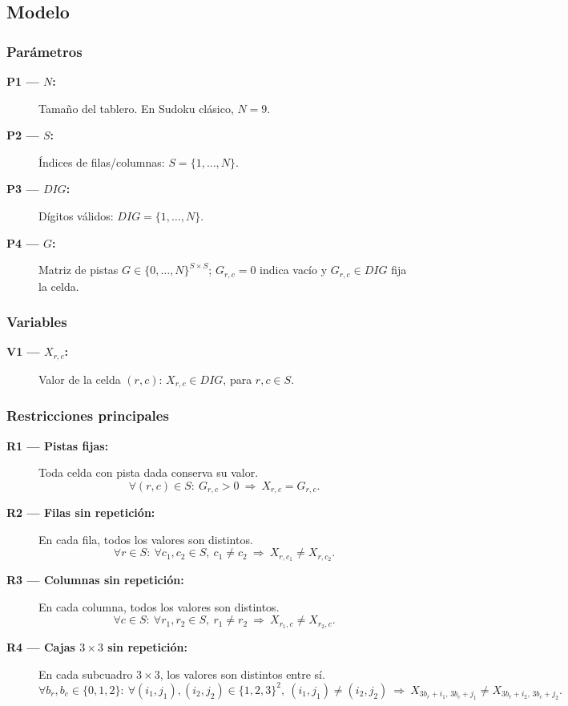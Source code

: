 
\subsection{Modelo}\label{sec:01-sudoku-modelo}

\subsubsection*{Parámetros}
\begin{description}
  \item[\textbf{P1 — \(N\):}] Tamaño del tablero. En Sudoku clásico, \(N=9\).
  \item[\textbf{P2 — \(S\):}] Índices de filas/columnas: \(S=\{1,\dots,N\}\).
  \item[\textbf{P3 — \(DIG\):}] Dígitos válidos: \(DIG=\{1,\dots,N\}\).
  \item[\textbf{P4 — \(G\):}] Matriz de pistas \(G\in\{0,\dots,N\}^{S\times S}\); \(G_{r,c}=0\) indica vacío y \(G_{r,c}\in DIG\) fija la celda.
\end{description}

\subsubsection*{Variables}
\begin{description}
  \item[\textbf{V1 — \(X_{r,c}\):}] Valor de la celda \((r,c)\): \(X_{r,c}\in DIG\), para \(r,c\in S\).
\end{description}

\subsubsection*{Restricciones principales}
\begin{description}
  \item[\textbf{R1 — Pistas fijas:}] Toda celda con pista dada conserva su valor.  
  \[
  \forall (r,c)\in S:\ G_{r,c} > 0 \ \Rightarrow\  X_{r,c} = G_{r,c}.
  \]

  \item[\textbf{R2 — Filas sin repetición:}] En cada fila, todos los valores son distintos.  
  \[
  \forall r \in S:\ \forall c_1, c_2 \in S,\ c_1 \neq c_2 \ \Rightarrow\  X_{r,c_1} \neq X_{r,c_2}.
  \]

  \item[\textbf{R3 — Columnas sin repetición:}] En cada columna, todos los valores son distintos.  
  \[
  \forall c \in S:\ \forall r_1, r_2 \in S,\ r_1 \neq r_2 \ \Rightarrow\  X_{r_1,c} \neq X_{r_2,c}.
  \]

  \item[\textbf{R4 — Cajas \(3\times3\) sin repetición:}] En cada subcuadro \(3\times3\), los valores son distintos entre sí.  
  \[
  \forall b_r,b_c \in \{0,1,2\}:\ 
  \forall (i_1,j_1),(i_2,j_2) \in \{1,2,3\}^2,\ (i_1,j_1) \neq (i_2,j_2) \ \Rightarrow\ 
  X_{3b_r+i_1,\,3b_c+j_1} \neq X_{3b_r+i_2,\,3b_c+j_2}.
  \]
\end{description}


